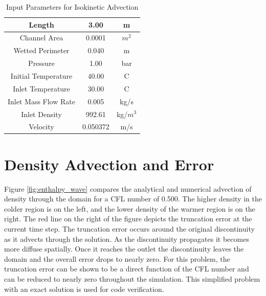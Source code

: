     \begin{table}[!h]
    	\center
    	\label{table:Advection_Params}
    	\caption{Input Parameters for Isokinetic Advection}
    	\begin{tabular}{|c|c|c|}
    		\hline
	    	Length 	  				&  3.00		& m 		\\ \hline 
	    	Channel Area			&  0.0001	& $m^{2}$	\\ \hline
	    	Wetted Perimeter		&  0.040	& m			\\ \hline
	    	Pressure  				&  1.00		& bar		\\ \hline
	    	Initial Temperature		&  40.00	& C			\\ \hline
	    	Inlet Temperature		&  30.00 	& C			\\ \hline
	    	Inlet Mass Flow Rate 	&  0.005	& kg/s		\\ \hline 
	    	Inlet Density			&  992.61	& kg/$m^{3}$\\ \hline
	    	Velocity				&  0.050372	& m/s		\\ \hline
    	\end{tabular}
    \end{table}
    
    \section{Density Advection and Error}
    
    Figure \ref{fig:enthalpy_wave} compares the analytical and numerical
    advection of density through the domain for a CFL number of 0.500. The
    higher density in the colder region is on the left, and the lower density of
    the warmer region is on the right. The red line on the right of the figure
    depicts the truncation error at the current time step. The truncation error
    occurs around the original discontinuity as it advects through the solution.
    As the discontinuity propagates it becomes more diffuse spatially. Once it
    reaches the outlet the discontinuity leaves the domain and the overall error
    drops to nearly zero. For this problem, the truncation error can be shown to
    be a direct function of the CFL number and can be reduced to nearly zero
    throughout the simulation. This simplified problem with an exact solution is
    used for code verification.
    
